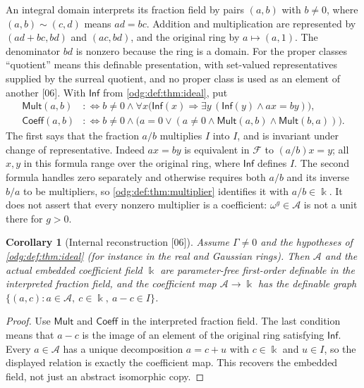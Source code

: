 \documentclass[11pt,oneside]{article}
\numberwithin{equation}{section}
\newtheorem{corollary}[corollary]{Corollary}
\theoremstyle{definition}
\theoremstyle{remark}
\newcommand{\src}[1]{\textup{\textsf{\small[#1]}}}
\begin{document}
An integral domain interprets its fraction field by pairs $(a,b)$ with
$b\ne0$, where $(a,b)\sim(c,d)$ means $ad=bc$. Addition and multiplication
are represented by $(ad+bc,bd)$ and $(ac,bd)$, and the original ring by
$a\mapsto(a,1)$. The denominator $bd$ is nonzero because the ring is a
domain. For the proper classes
``quotient'' means this definable presentation, with set-valued
representatives supplied by the surreal quotient, and no proper class is used
as an element of another \src{06}. With $\mathsf{Inf}$ from
\cref{odg:def:thm:ideal}, put
\begin{align*}
 \mathsf{Mult}(a,b)&:\Longleftrightarrow b\ne0\wedge\forall x\bigl(\mathsf{Inf}(x)
 \Rightarrow\exists y\,(\mathsf{Inf}(y)\wedge ax=by)\bigr),\\
 \mathsf{Coeff}(a,b)&:\Longleftrightarrow b\ne0\wedge\bigl(a=0\vee(a\ne0\wedge
 \mathsf{Mult}(a,b)\wedge\mathsf{Mult}(b,a))\bigr).
\end{align*}
The first says that the fraction $a/b$ multiplies $I$ into $I$, and is
invariant under change of representative. Indeed $ax=by$ is equivalent in
$\mathcal F$ to $(a/b)x=y$; all $x,y$ in this formula range over the original
ring, where $\mathsf{Inf}$ defines $I$. The second formula handles zero
separately and otherwise requires both $a/b$ and its inverse $b/a$ to be
multipliers, so \cref{odg:def:thm:multiplier} identifies it with
$a/b\in\Bbbk$. It does not assert that every nonzero multiplier is a
coefficient: $\omega^g\in\mathcal A$ is not a unit there for $g>0$.

\begin{corollary}[Internal reconstruction \src{06}]\label{odg:def:cor:internal}
Assume $\Gamma\ne0$ and the hypotheses of \cref{odg:def:thm:ideal} (for
instance in the real and Gaussian rings). Then $\mathcal A$ and the actual
embedded coefficient field
$\Bbbk$ are parameter-free first-order definable in the interpreted fraction
field, and the coefficient map $\mathcal A\to\Bbbk$ has the definable graph
$\{(a,c):a\in\mathcal A,\ c\in\Bbbk,\ a-c\in I\}$.
\end{corollary}
\begin{proof}
Use $\mathsf{Mult}$ and $\mathsf{Coeff}$ in the interpreted fraction field.
The last condition means that $a-c$ is the image of an element of the
original ring satisfying $\mathsf{Inf}$. Every $a\in\mathcal A$ has a unique
decomposition $a=c+u$ with $c\in\Bbbk$ and $u\in I$, so the displayed
relation is exactly the coefficient map. This recovers the embedded field,
not just an abstract isomorphic copy.
\end{proof}
\end{document}
